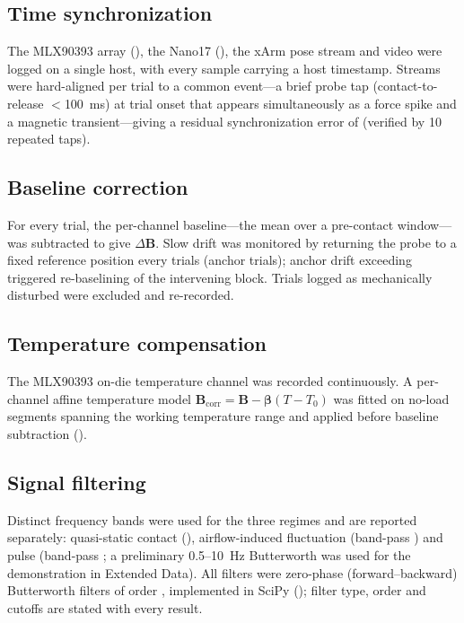\subsection*{Time synchronization}
The MLX90393 array (), the Nano17 (),
the xArm pose stream and video were logged on a single host, with every
sample carrying a host timestamp. Streams were hard-aligned per trial to a
common event---a brief probe tap (contact-to-release $<$100~ms) at trial
onset that appears simultaneously as a force spike and a magnetic
transient---giving a residual synchronization error of 
(verified by 10 repeated taps).

\subsection*{Baseline correction}
For every trial, the per-channel baseline---the mean over a
 pre-contact window---was subtracted to
give $\Delta\mathbf{B}$. Slow drift was monitored by returning the probe to a
fixed reference position every  trials (anchor trials);
anchor drift exceeding  triggered re-baselining
of the intervening block. Trials logged as mechanically disturbed were
excluded and re-recorded.

\subsection*{Temperature compensation}
The MLX90393 on-die temperature channel was recorded continuously. A
per-channel affine temperature model $\mathbf{B}_{\mathrm{corr}}=\mathbf{B}-
\boldsymbol{\beta}(T-T_0)$ was fitted on no-load segments spanning the
working temperature range and applied before baseline subtraction
().

\subsection*{Signal filtering}
Distinct frequency bands were used for the three regimes and are reported
separately: quasi-static contact (),
airflow-induced fluctuation (band-pass ) and pulse
(band-pass ; a preliminary 0.5--10~Hz Butterworth was
used for the demonstration in Extended Data). All filters were zero-phase
(forward--backward) Butterworth filters of order ,
implemented in SciPy (); filter type, order and cutoffs
are stated with every result.

